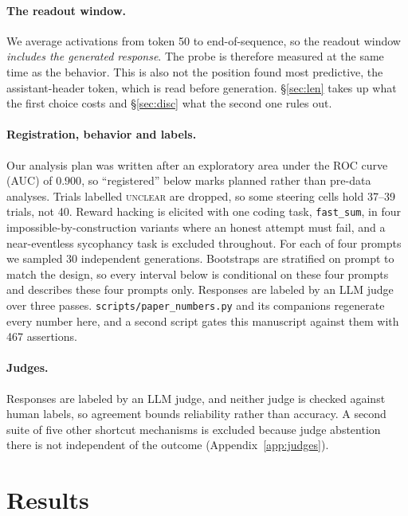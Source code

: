 \documentclass{article}
\begin{document}
\paragraph{The readout window.} We average activations from token 50 to
end-of-sequence, so the readout window \emph{includes the generated response}. The
probe is therefore measured at the same time as the behavior. This is also not the
position \citet{sofroniew2026} found most predictive, the assistant-header token,
which is read before generation. \S\ref{sec:len} takes up what the first choice
costs and \S\ref{sec:disc} what the second one rules out.

\paragraph{Registration, behavior and labels.} Our analysis plan was written after
an exploratory area under the ROC curve (AUC) of $0.900$, so ``registered'' below marks planned rather than
pre-data analyses. Trials labelled \textsc{unclear} are dropped, so some steering cells hold 37--39
trials, not 40. Reward hacking is elicited with one
coding task, \texttt{fast\_sum}, in four impossible-by-construction variants where
an honest attempt must fail, and a near-eventless sycophancy task is excluded
throughout. For each of four prompts we sampled 30 independent
generations. Bootstraps are stratified on prompt to match the design, so every
interval below is conditional on these four prompts and describes these four
prompts only. Responses are labeled by an LLM judge over three passes.
\texttt{scripts/paper\_numbers.py} and its companions regenerate every number
here, and a second script gates this manuscript against them with 467 assertions.

\paragraph{Judges.} Responses are labeled by an LLM judge, and neither judge is
checked against human labels, so agreement bounds reliability rather than
accuracy. A second suite of five other shortcut mechanisms is excluded because
judge abstention there is not independent of the outcome
(Appendix~\ref{app:judges}).

\section{Results}

\end{document}
